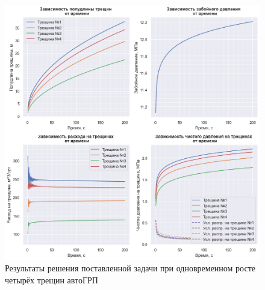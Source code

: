 \begin{figure}[H] 
\center
\includegraphics[width=0.85\linewidth]{images/Kirchhoff+Koning_4.png}
\caption{Результаты решения поставленной задачи при одновременном росте четырёх трещин автоГРП} 
\label{fig:results4}  
\end{figure}

